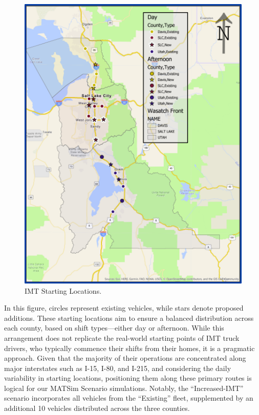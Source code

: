 \documentclass[
  letterpaper,
  authoryear]{elsarticle}
\begin{document}
\begin{figure}

{\centering \includegraphics{figures/imt_map.png}

}

\caption{\label{fig-IMT_Map}IMT Starting Locations.}

\end{figure}

In this figure, circles represent existing vehicles, while stars denote
proposed additions. These starting locations aim to ensure a balanced
distribution across each county, based on shift types---either day or
afternoon. While this arrangement does not replicate the real-world
starting points of IMT truck drivers, who typically commence their
shifts from their homes, it is a pragmatic approach. Given that the
majority of their operations are concentrated along major interstates
such as I-15, I-80, and I-215, and considering the daily variability in
starting locations, positioning them along these primary routes is
logical for our MATSim Scenario simulations. Notably, the
``Increased-IMT'' scenario incorporates all vehicles from the
``Existing'' fleet, supplemented by an additional 10 vehicles
distributed across the three counties.
\end{document}
